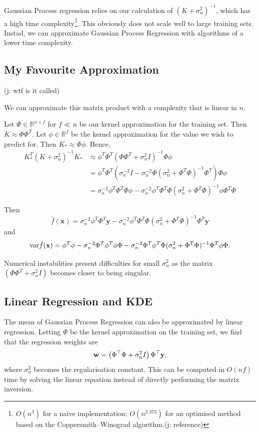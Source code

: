 \documentclass[11pt,twoside]{report}
\newcommand\bw{\mathbf{w}}
\newcommand\bx{\mathbf{x}}
\newcommand\by{\mathbf{y}}
\newcommand\bbR{\mathbb{R}}
\newcommand\var{\mathrm{var}}
\newcommand\jakub[1]{{\color{red}(j: #1)}}
\begin{document}
Gaussian Process regression relies on our calculation of $(K+\sigma_n^2)^{-1}$, which has a high time complexity\footnote{$O(n^3)$ for a naive implementation; $O(n^{2.373})$ for an optimised method based on the Coppersmith–Winograd algorithm.\jakub{reference}}. This obviously does not scale well to large training sets. Instad, we can approximate Gaussian Process Regression with algorithms of a lower time complexity.

\subsection{My Favourite Approximation}

\jakub{wtf is it called}

We can approximate this matrix product with a complexity that is linear in $n$.

Let $\Phi \in \bbR^{n \times f}$ for $f \ll n$ be our kernel approximation for the training set. Then $K \approx \Phi \Phi^T$. Let $\phi \in \bbR^{f}$ be the kernel approximation for the value we wish to predict for. Then $K_* \approx \Phi \phi$. Hence,\begin{align*}
    K_*^T(K+\sigma_n^2)^{-1}K_* &\approx \phi^T\Phi^T  \left(\Phi \Phi^T + \sigma_n^2I\right)^{-1} \Phi\phi \\
    &= \phi^T\Phi^T  \left( \sigma_n^{-2}I - \sigma_n^{-2}\Phi(\sigma_n^{2} + \Phi^T\Phi)^{-1}\Phi^T\right) \Phi\phi \\
    &=  \sigma_n^{-2}\phi^T\Phi^T\Phi\phi - \sigma_n^{-2}\phi^T\Phi^T \Phi(\sigma_n^{2} + \Phi^T\Phi)^{-1}\phi\Phi^T\Phi
\end{align*}

Then \[
    \hat f(\bx) = \sigma_n^{-2} \phi^T\Phi^T\by - \sigma_n^{-2} \phi^T\Phi^T\Phi(\sigma_n^{2} + \Phi^T\Phi)^{-1}\Phi^T\by
\] and \[
    \var \hat f(\bx) = \phi^T\phi - \sigma_n^{-2}\Phi^T \phi^T\phi\Phi - \sigma_n^{-2}\Phi^T \phi^T\Phi(\sigma_n^{2} + \Phi^T\Phi)^{-1}\Phi^T\phi\Phi\text.
\]

Numerical instabilities present difficulties for small $\sigma_n^2$ as the matrix $(\Phi\Phi^T + \sigma_n^2I)$ becomes closer to being singular.

\subsection{Linear Regression and KDE}

The mean of Gaussian Process Regression can also be approximated by linear regression. Letting $\Phi$ be the kernel approximation on the training set, we find that the regression weights are\[
    \bw = \left(\Phi^\top\Phi + \sigma_n^2 I\right) \Phi^\top\by\text,
\] where $\sigma_n^2$ becomes the regularisation constant. This can be computed in $O(nf)$ time by solving the linear equation instead of directly performing the matrix inversion.
\end{document}
